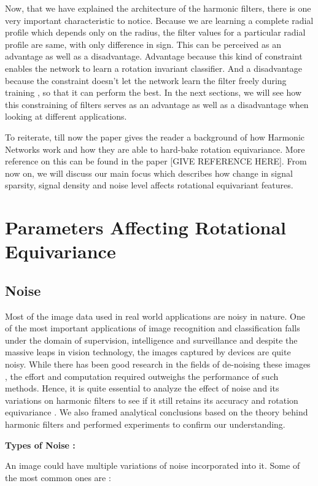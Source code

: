 \documentclass{article}
\begin{document}
Now, that we have explained the architecture of the harmonic filters, there is one very important characteristic to notice. Because we are learning a complete radial profile which depends only on the radius, the filter values for a particular radial profile are same, with only difference in sign. This can be perceived as an advantage as well as a disadvantage. Advantage because this kind of constraint enables the network to learn a rotation invariant classifier. And a disadvantage because the constraint doesn't let the network learn the filter freely during training , so that it can perform the best. In the next sections, we will see how this constraining of filters serves as an advantage as well as a disadvantage when looking at different applications.

To reiterate, till now the paper gives the reader a background of how Harmonic Networks work and how they are able to hard-bake rotation equivariance. More reference on this can be found in the paper [GIVE REFERENCE HERE]. From now on, we will discuss our main focus which describes how change in signal sparsity, signal density and noise level affects rotational equivariant features. 

\section{Parameters Affecting Rotational Equivariance}

\subsection{Noise}
Most of the image data used in real world applications are noisy in nature. One of the most important applications of image recognition and classification falls under the domain of supervision, intelligence and surveillance and despite the massive leaps in vision technology, the images captured by devices are quite noisy. While there has been good research in the fields of de-noising these images , the effort and computation required outweighs the performance of such methods. 
Hence, it is quite essential to analyze the effect of noise and its variations on harmonic filters to see if it still retains its accuracy and rotation equivariance . We also framed analytical conclusions based on the theory behind harmonic filters and performed experiments to confirm our understanding.

\textbf{Types of Noise :}

An image could have multiple variations of noise incorporated into it. Some of the most common ones are :
\end{document}
